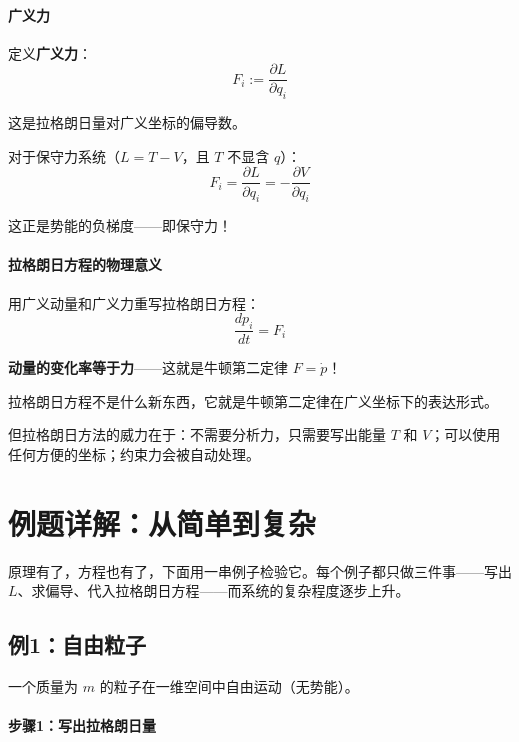 \paragraph{广义力}

定义\textbf{广义力}：
\begin{equation}
F_i := \frac{\partial L}{\partial q_i}
\end{equation}

这是拉格朗日量对广义坐标的偏导数。

对于保守力系统（$L = T - V$，且 $T$ 不显含 $q$）：
\[
F_i = \frac{\partial L}{\partial q_i} = -\frac{\partial V}{\partial q_i}
\]

这正是势能的负梯度——即保守力！

\paragraph{拉格朗日方程的物理意义}

用广义动量和广义力重写拉格朗日方程：
\[
\frac{dp_i}{dt} = F_i
\]

\textbf{动量的变化率等于力}——这就是牛顿第二定律 $F = \dot{p}$！

\begin{insightbox}
拉格朗日方程不是什么新东西，它就是牛顿第二定律在广义坐标下的表达形式。

但拉格朗日方法的威力在于：不需要分析力，只需要写出能量 $T$ 和 $V$；可以使用任何方便的坐标；约束力会被自动处理。
\end{insightbox}

\section{例题详解：从简单到复杂}

原理有了，方程也有了，下面用一串例子检验它。每个例子都只做三件事——写出 $L$、求偏导、代入拉格朗日方程——而系统的复杂程度逐步上升。

\subsection{例1：自由粒子}

一个质量为 $m$ 的粒子在一维空间中自由运动（无势能）。

\paragraph{步骤1：写出拉格朗日量}

